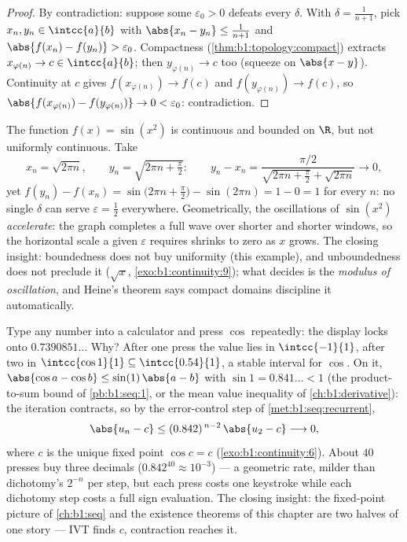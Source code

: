 \begin{proof}
By contradiction: suppose some $\varepsilon_0 > 0$ defeats every
$\delta$. With $\delta = \frac{1}{n+1}$, pick $x_n, y_n \in
\intcc{a}{b}$ with $\abs{x_n - y_n} \leq \frac{1}{n+1}$ and
$\abs{f(x_n) - f(y_n)} > \varepsilon_0$. Compactness
(\cref{thm:b1:topology:compact}) extracts $x_{\varphi(n)} \to c \in
\intcc{a}{b}$; then $y_{\varphi(n)} \to c$ too (squeeze on $\abs{x -
y}$). Continuity at $c$ gives $f(x_{\varphi(n)}) \to f(c)$ and
$f(y_{\varphi(n)}) \to f(c)$, so $\abs{f(x_{\varphi(n)}) -
f(y_{\varphi(n)})} \to 0 < \varepsilon_0$: contradiction.
\end{proof}

\begin{example}\label{ex:b1:continuity:sinx2}
The function $f(x) = \sin(x^2)$ is continuous and bounded on
$\R$, but not uniformly continuous. Take
\[
x_n = \sqrt{2\pi n}, \qquad y_n = \sqrt{2\pi n + \tfrac\pi2}:
\qquad
y_n - x_n = \frac{\pi/2}{\sqrt{2\pi n + \frac\pi2} +
\sqrt{2\pi n}} \longrightarrow 0 ,
\]
yet $f(y_n) - f(x_n) = \sin\bigl(2\pi n + \frac\pi2\bigr) -
\sin(2\pi n) = 1 - 0 = 1$ for every $n$: no single $\delta$ can
serve $\varepsilon = \frac12$ everywhere. Geometrically, the
oscillations of $\sin(x^2)$ \emph{accelerate}: the graph
completes a full wave over shorter and shorter windows, so the
horizontal scale a given $\varepsilon$ requires shrinks to zero
as $x$ grows. The closing insight: boundedness does not buy
uniformity (this example), and unboundedness does not preclude
it ($\sqrt x$, \cref{exo:b1:continuity:9}); what decides is the
\emph{modulus of oscillation}, and Heine's theorem says compact
domains discipline it automatically.
\end{example}

\begin{example}\label{ex:b1:continuity:cositeration}
Type any number into a calculator and press $\cos$ repeatedly:
the display locks onto $0.7390851\dots$ Why? After one press the
value lies in $\intcc{-1}{1}$, after two in $\intcc{\cos 1}{1}
\subseteq \intcc{0.54}{1}$, a stable interval for $\cos$. On it,
$\abs{\cos a - \cos b} \leq \sin(1)\,\abs{a - b}$ with $\sin 1 =
0.841\dots < 1$ (the product-to-sum bound of
\cref{pb:b1:seq:1}, or the mean value inequality of
\cref{ch:b1:derivative}): the iteration contracts, so by the
error-control step of \cref{met:b1:seq:recurrent},
\[
\abs{u_n - c} \leq (0.842)^{\,n-2}\,\abs{u_2 - c}
\longrightarrow 0 ,
\]
where $c$ is the unique fixed point $\cos c = c$
(\cref{exo:b1:continuity:6}). About $40$ presses buy three
decimals ($0.842^{40} \approx 10^{-3}$) --- a geometric rate,
milder than dichotomy's $2^{-n}$ per step, but each press costs
one keystroke while each dichotomy step costs a full sign
evaluation. The closing insight: the fixed-point picture of
\cref{ch:b1:seq} and the existence theorems of this chapter are
two halves of one story --- IVT finds $c$, contraction reaches
it.
\end{example}

